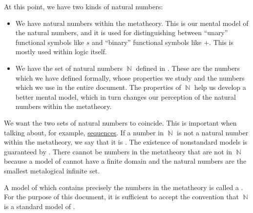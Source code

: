 \begin{remark}\label{rem:standard_models_of_arithmetic}
  At this point, we have two kinds of natural numbers:
  \begin{itemize}
    \item We have natural numbers within the metatheory. This is our mental model of the natural numbers, and it is used for distinguishing between \enquote{unary} functional symbols like \( s \) and \enquote{binary} functional symbols like \( + \). This is mostly used within logic itself.

    \item We have the set of natural numbers \( \BbbN \) defined in . These are the numbers which we have defined formally, whose properties we study and the numbers which we use in the entire document. The properties of \( \BbbN \) help us develop a better mental model, which in turn changes our perception of the natural numbers within the metatheory.
  \end{itemize}

  We want the two sets of natural numbers to coincide. This is important when talking about, for example, \hyperref[def:sequence]{sequences}. If a number in \( \BbbN \) is not a natural number within the metatheory, we say that it is . The existence of nonstandard models is guaranteed by . There cannot be numbers in the metatheory that are not in \( \BbbN \) because a model of  cannot have a finite domain and the natural numbers are the smallest metalogical infinite set.

  A model of  which contains precisely the numbers in the metatheory is called a . For the purpose of this document, it is sufficient to accept the convention that \( \BbbN \) is a standard model of .
\end{remark}

